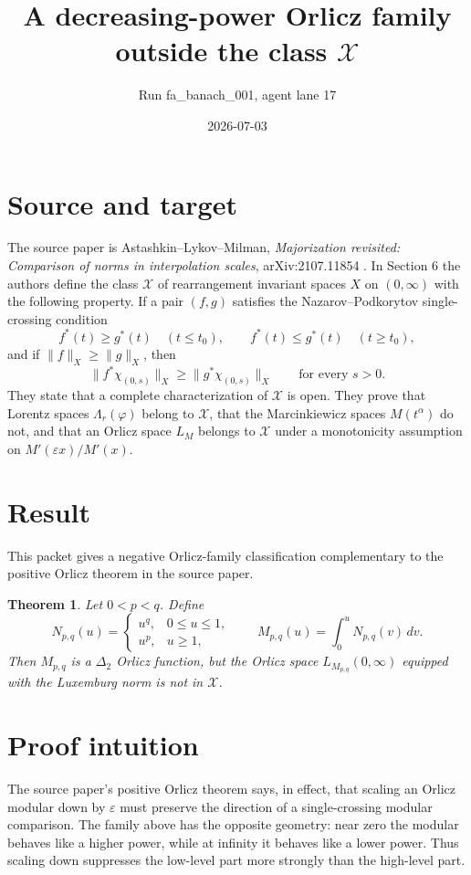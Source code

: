 \documentclass[11pt]{article}
\title{A decreasing-power Orlicz family outside the class \texorpdfstring{$\mathcal X$}{X}}
\author{Run fa\_banach\_001, agent lane 17}
\date{2026-07-03}
\newtheorem{theorem}{Theorem}
\newcommand{\Xclass}{\mathcal X}
\begin{document}
\maketitle

\section*{Source and target}

The source paper is Astashkin--Lykov--Milman, \emph{Majorization revisited:
Comparison of norms in interpolation scales}, arXiv:2107.11854 \cite{ALM}.
In Section 6 the authors define the class $\Xclass$ of rearrangement invariant
spaces $X$ on $(0,\infty)$ with the following property. If a pair $(f,g)$
satisfies the Nazarov--Podkorytov single-crossing condition
\[
 f^*(t) \ge g^*(t)\quad (t\le t_0),\qquad
 f^*(t) \le g^*(t)\quad (t\ge t_0),
\]
and if $\|f\|_X\ge \|g\|_X$, then
\[
 \|f^*\chi_{(0,s)}\|_X\ge \|g^*\chi_{(0,s)}\|_X
 \qquad\text{for every }s>0.
\]
They state that a complete characterization of $\Xclass$ is open. They prove
that Lorentz spaces $\Lambda_r(\varphi)$ belong to $\Xclass$, that the
Marcinkiewicz spaces $M(t^\alpha)$ do not, and that an Orlicz space $L_M$
belongs to $\Xclass$ under a monotonicity assumption on
$M'(\varepsilon x)/M'(x)$.

\section*{Result}

This packet gives a negative Orlicz-family classification complementary to the
positive Orlicz theorem in the source paper.

\begin{theorem}
\label{thm:decreasing-power}
Let $0<p<q$. Define
\[
 N_{p,q}(u)=
 \begin{cases}
   u^q, & 0\le u\le 1,\\
   u^p, & u\ge 1,
 \end{cases}
 \qquad
 M_{p,q}(u)=\int_0^u N_{p,q}(v)\,dv .
\]
Then $M_{p,q}$ is a $\Delta_2$ Orlicz function, but the Orlicz space
$L_{M_{p,q}}(0,\infty)$ equipped with the Luxemburg norm is not in
$\Xclass$.
\end{theorem}

\section*{Proof intuition}

The source paper's positive Orlicz theorem says, in effect, that scaling an
Orlicz modular down by $\varepsilon$ must preserve the direction of a
single-crossing modular comparison. The family above has the opposite
geometry: near zero the modular behaves like a higher power, while at infinity
it behaves like a lower power. Thus scaling down suppresses the low-level
part more strongly than the high-level part.
\end{document}
